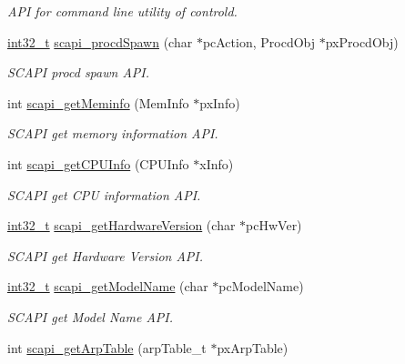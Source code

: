 \begin{DoxyCompactItemize}
\begin{DoxyCompactList}\small\item\em A\-P\-I for command line utility of controld. \end{DoxyCompactList}\item 
\hyperlink{commondefs_8h_a32f2e37ee053cf2ce8ca28d1f74630e5}{int32\-\_\-t} \hyperlink{group__LIBSCAPI_gaffb61bb464f6359d31a433b1a7085dd5}{scapi\-\_\-procd\-Spawn} (char $\ast$pc\-Action, Procd\-Obj $\ast$px\-Procd\-Obj)
\begin{DoxyCompactList}\small\item\em S\-C\-A\-P\-I procd spawn A\-P\-I. \end{DoxyCompactList}\item 
int \hyperlink{group__LIBSCAPI_ga0e74d65cb49b1de637607af1bf0ba66b}{scapi\-\_\-get\-Meminfo} (Mem\-Info $\ast$px\-Info)
\begin{DoxyCompactList}\small\item\em S\-C\-A\-P\-I get memory information A\-P\-I. \end{DoxyCompactList}\item 
int \hyperlink{group__LIBSCAPI_gaf7547717eb0842457c303a2f079f3b5b}{scapi\-\_\-get\-C\-P\-U\-Info} (C\-P\-U\-Info $\ast$x\-Info)
\begin{DoxyCompactList}\small\item\em S\-C\-A\-P\-I get C\-P\-U information A\-P\-I. \end{DoxyCompactList}\item 
\hyperlink{commondefs_8h_a32f2e37ee053cf2ce8ca28d1f74630e5}{int32\-\_\-t} \hyperlink{group__LIBSCAPI_ga3a8bf8a55d5fc2cd7d22466af7f544ed}{scapi\-\_\-get\-Hardware\-Version} (char $\ast$pc\-Hw\-Ver)
\begin{DoxyCompactList}\small\item\em S\-C\-A\-P\-I get Hardware Version A\-P\-I. \end{DoxyCompactList}\item 
\hyperlink{commondefs_8h_a32f2e37ee053cf2ce8ca28d1f74630e5}{int32\-\_\-t} \hyperlink{group__LIBSCAPI_ga7b0c5f4426883487e40715e2e80137dd}{scapi\-\_\-get\-Model\-Name} (char $\ast$pc\-Model\-Name)
\begin{DoxyCompactList}\small\item\em S\-C\-A\-P\-I get Model Name A\-P\-I. \end{DoxyCompactList}\item 
int \hyperlink{group__LIBSCAPI_gada7b44505a6113fbe3ee3d3e16109141}{scapi\-\_\-get\-Arp\-Table} (arp\-Table\-\_\-t $\ast$px\-Arp\-Table)

\end{DoxyCompactItemize}
